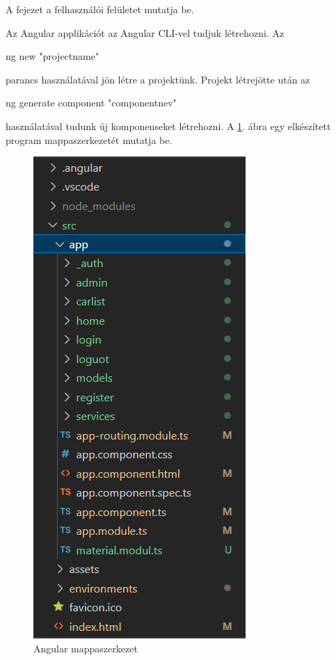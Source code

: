 
A fejezet a felhasználói felületet mutatja be.

Az Angular applikációt az Angular CLI-vel tudjuk létrehozni. Az
\begin{java}
ng new "projectname"
\end{java} 
parancs használatával jön létre a projektünk. Projekt létrejötte után az
\begin{java}
ng generate component "componentnev"
\end{java}
 használatával tudunk új komponenseket létrehozni.
A \ref{fig:mappaszerkezet}. ábra egy elkészített program mappaszerkezetét mutatja be.

\begin{figure}[h]
\centering
\includegraphics[scale=0.6]{images/angular_mappaszerkezet.png}
\caption{Angular mappaszerkezet}
\label{fig:mappaszerkezet}
\end{figure}
\newpage

